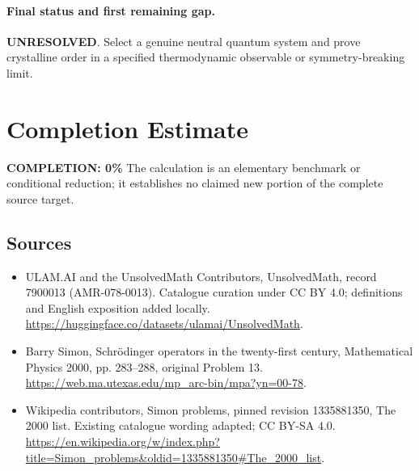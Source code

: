 \documentclass[11pt]{article}
\begin{document}
\paragraph{Final status and first remaining gap.}
\textbf{UNRESOLVED}. Select a genuine neutral quantum system and prove crystalline order in a specified thermodynamic observable or symmetry-breaking limit.

\section{Completion Estimate}
\noindent\textbf{COMPLETION: 0\%}
The calculation is an elementary benchmark or conditional reduction; it establishes no claimed new portion of the complete source target.

\subsection{Sources}
\begin{itemize}
\item[\hypertarget{source:7900013:1}{S1}] ULAM.AI and the UnsolvedMath Contributors, UnsolvedMath, record 7900013 (AMR-078-0013). Catalogue curation under CC BY 4.0; definitions and English exposition added locally.
\url{https://huggingface.co/datasets/ulamai/UnsolvedMath}.
\item[\hypertarget{source:7900013:2}{S2}] Barry Simon, Schrödinger operators in the twenty-first century, Mathematical Physics 2000, pp. 283–288, original Problem 13.
\url{https://web.ma.utexas.edu/mp_arc-bin/mpa?yn=00-78}.
\item[\hypertarget{source:7900013:3}{S3}] Wikipedia contributors, Simon problems, pinned revision 1335881350, The 2000 list. Existing catalogue wording adapted; CC BY-SA 4.0.
\url{https://en.wikipedia.org/w/index.php?title=Simon_problems&oldid=1335881350#The_2000_list}.
\end{itemize}
\label{end:7900013}
\end{document}
